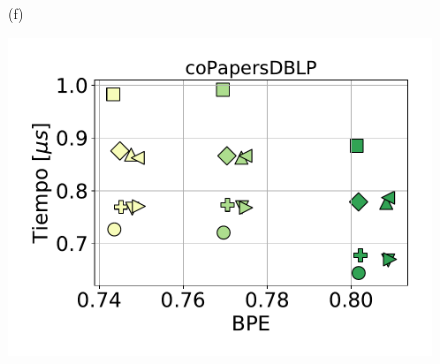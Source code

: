 \begin{figure}
\begin{minipage}{1\textwidth}
\begin{minipage}{0.45\textwidth}
\begin{minipage}{0.2\textwidth}
    			\end{minipage}
    			
    			(f)
    		\end{minipage}  
    	\end{minipage}
    	
	\begin{minipage}{1\textwidth}
    		\centering
    		\begin{minipage}{0.45\textwidth}
    			\centering
    			\begin{minipage}{0.70\textwidth}
    				\centering
    				\includegraphics[width=1\linewidth]{img/sdsl/secuencial/coPapersDBLP.pdf}
    			\end{minipage}
    			\begin{minipage}{0.25\textwidth}
    				\centering

\end{minipage}
\end{minipage}
\end{minipage}
\end{figure}
